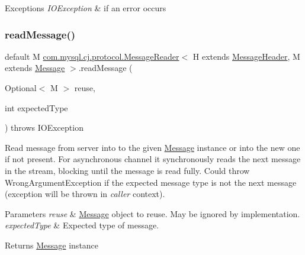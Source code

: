 \begin{DoxyExceptions}{Exceptions}
{\em I\+O\+Exception} & if an error occurs \\
\hline
\end{DoxyExceptions}
\mbox{\label{interfacecom_1_1mysql_1_1cj_1_1protocol_1_1_message_reader_aee5bf8361feb7ddf7e420a0d19a0cf61}} 
\subsubsection{\texorpdfstring{read\+Message()}{readMessage()}\hspace{0.1cm}{\footnotesize\ttfamily [2/2]}}
{\footnotesize\ttfamily default M \mbox{\hyperlink{interfacecom_1_1mysql_1_1cj_1_1protocol_1_1_message_reader}{com.\+mysql.\+cj.\+protocol.\+Message\+Reader}}$<$ H extends \mbox{\hyperlink{interfacecom_1_1mysql_1_1cj_1_1protocol_1_1_message_header}{Message\+Header}}, M extends \mbox{\hyperlink{interfacecom_1_1mysql_1_1cj_1_1protocol_1_1_message}{Message}} $>$.read\+Message (\begin{DoxyParamCaption}\item[{Optional$<$ M $>$}]{reuse,  }\item[{int}]{expected\+Type }\end{DoxyParamCaption}) throws I\+O\+Exception}

Read message from server into to the given \mbox{\hyperlink{interfacecom_1_1mysql_1_1cj_1_1protocol_1_1_message}{Message}} instance or into the new one if not present. For asynchronous channel it synchronously reads the next message in the stream, blocking until the message is read fully. Could throw Wrong\+Argument\+Exception if the expected message type is not the next message (exception will be thrown in {\itshape caller} context).


\begin{DoxyParams}{Parameters}
{\em reuse} & \mbox{\hyperlink{interfacecom_1_1mysql_1_1cj_1_1protocol_1_1_message}{Message}} object to reuse. May be ignored by implementation. \\
\hline
{\em expected\+Type} & Expected type of message. \\
\hline
\end{DoxyParams}
\begin{DoxyReturn}{Returns}
\mbox{\hyperlink{interfacecom_1_1mysql_1_1cj_1_1protocol_1_1_message}{Message}} instance 
\end{DoxyReturn}

